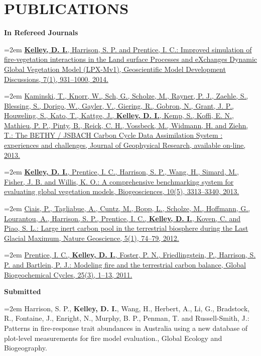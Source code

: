 \documentclass[paper=a4,fontsize=11pt]{scrartcl}	 			%
\newcommand{\sepspace}{\vspace*{1em}}			%
\newcommand{\NewPart}[1]{\section*{\uppercase{#1}}}
\newcommand{\BibEntry}[2]{
		\noindent \textbf{#1} \hfill \par					%
		\noindent\hangindent=2em\hangafter=0 \small #2 	%
		\normalsize \par}
\begin{document}
  
\NewPart{Publications}

\BibEntry{In Refereed Journals}{\href{http://www.geosci-model-dev-discuss.net/7/931/2014/gmdd-7-931-2014.html}{\textbf{Kelley, D. I.}, Harrison, S. P. and Prentice, I. C.: Improved simulation of fire-vegetation interactions in the Land surface Processes and eXchanges Dynamic Global Vegetation Model (LPX-Mv1), Geoscientific Model Development Discussions, 7(1), 931--1000, 2014.}}


\BibEntry{} {\href{http://onlinelibrary.wiley.com/doi/10.1002/jgrg.20118/abstract}{Kaminski, T., Knorr, W., Sch, G., Scholze, M., Rayner, P. J., Zaehle, S., Blessing, S., Dorigo, W., Gayler, V., Giering, R., Gobron, N., Grant, J. P., Houweling, S., Kato, T., Kattge, J., \textbf{Kelley, D. I.}, Kemp, S., Koffi, E. N., Mathieu, P. P., Pinty, B., Reick, C. H., Vossbeck, M., Widmann, H. and Ziehn, T.: The BETHY / JSBACH Carbon Cycle Data Assimilation System : experiences and challenges, Journal of Geophysical Research, available on-line, 2013.}}


\BibEntry{} {\href{http://www.biogeosciences.net/10/3313/2013/bg-10-3313-2013.html}{\textbf{Kelley, D. I.}, Prentice, I. C., Harrison, S. P., Wang, H., Simard, M., Fisher, J. B. and Willis, K. O.: A comprehensive benchmarking system for evaluating global vegetation models, Biogeosciences, 10(5), 3313--3340, 2013.}}


\BibEntry{} {\href{http://www.nature.com/ngeo/journal/v5/n1/full/ngeo1324.html}{Ciais, P., Tagliabue, A., Cuntz, M., Bopp, L., Scholze, M., Hoffmann, G., Lourantou, A., Harrison, S. P., Prentice, I. C., \textbf{Kelley, D. I.}, Koven, C. and Piao, S. L.: Large inert carbon pool in the terrestrial biosphere during the Last Glacial Maximum, Nature Geoscience, 5(1), 74--79, 2012.}}


\BibEntry{} {\href{http://onlinelibrary.wiley.com/doi/10.1029/2010GB003906/abstract}{Prentice, I. C., \textbf{Kelley, D. I.}, Foster, P. N., Friedlingstein, P., Harrison, S. P. and Bartlein, P. J.: Modeling fire and the terrestrial carbon balance, Global Biogeochemical Cycles, 25(3), 1--13, 2011.}}
\sepspace

\BibEntry{Submitted} {Harrison, S. P., \textbf{Kelley, D. I.}, Wang, H., Herbert, A., Li, G., Bradstock, R., Fontaine, J., Enright, N., Murphy, B. P., Penman, T. and Russell-Smith, J.: Patterns in fire-response trait abundances in Australia using a new database of plot-level measurements for fire model evaluation., Global Ecology and Biogeography.}
\sepspace
\end{document}
